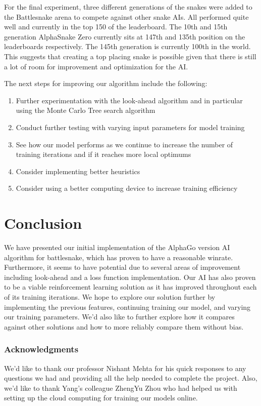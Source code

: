 \documentclass{article}
\begin{document}
For the final experiment, three different generations of the snakes were added
to the Battlesnake arena to compete against other snake AIs. All performed quite
well and currently in the top 150 of the leaderboard. The 10th and 15th
generation AlphaSnake Zero currently sits at 147th and 135th position on the
leaderboards respectively. The 145th generation is currently 100th in the world.
This suggests that creating a top placing snake is possible given that there is
still a lot of room for improvement and optimization for the AI.

The next steps for improving our algorithm include the following:

\begin{enumerate}
  \item Further experimentation with the look-ahead algorithm and in particular
        using the Monte Carlo Tree search algorithm
  \item Conduct further testing with varying input parameters for model training
  \item See how our model performs as we continue to increase the number of
        training iterations and if it reaches more local optimums
  \item Consider implementing better heuristics
  \item Consider using a better computing device to increase training efficiency
\end{enumerate}

\section{Conclusion}

We have presented our initial implementation of the AlphaGo version AI algorithm
for battlesnake, which has proven to have a reasonable winrate. Furthermore, it
seems to have potential due to several areas of improvement including look-ahead
and a loss function implementation. Our AI has also proven to be a viable
reinforcement learning solution as it has improved throughout each of its
training iterations. We hope to explore our solution further by implementing the
previous features, continuing training our model, and varying our training
parameters. We'd also like to further explore how it compares against other
solutions and how to more reliably compare them without bias.

\subsubsection*{Acknowledgments}

We'd like to thank our professor Nishant Mehta for his quick responses to any
questions we had and providing all the help needed to complete the project.
Also, we'd like to thank Yang's colleague ZhengYu Zhou who had helped us with
setting up the cloud computing for training our models online.

\newpage

\small


% 


\end{document}
